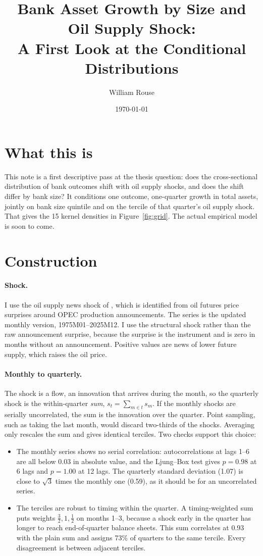 \documentclass[11pt]{article}
\title{Bank Asset Growth by Size and Oil Supply Shock:\\
       A First Look at the Conditional Distributions}
\author{William Rouse}
\date{\today}
\begin{document}
\maketitle

\section*{What this is}

This note is a first descriptive pass at the thesis question: does the cross-sectional distribution of bank outcomes shift with oil supply shocks, and does the shift differ by bank size? It conditions one outcome, one-quarter growth in total assets, jointly on bank size quintile and on the tercile of that quarter's oil supply shock. That gives the 15 kernel densities in Figure~\ref{fig:grid}. The actual empirical model is soon to come. 

\section*{Construction}

\paragraph{Shock.} I use the oil supply news shock of \citet{kanzig2021}, which is identified from oil futures price surprises around OPEC production announcements. The series is the updated monthly version, 1975M01--2025M12. I use the structural shock rather than the raw announcement surprise, because the surprise is the instrument and is zero in months without an announcement. Positive values are news of lower future supply, which raises the oil price.

\paragraph{Monthly to quarterly.} The shock is a flow, an innovation that arrives during the month, so the quarterly shock is the within-quarter \emph{sum}, $s_t = \sum_{m \in t} s_m$. If the monthly shocks are serially uncorrelated, the sum is the innovation over the quarter. Point sampling, such as taking the last month, would discard two-thirds of the shocks. Averaging only rescales the sum and gives identical terciles. Two checks support this choice:
\begin{itemize}
  \item The monthly series shows no serial correlation: autocorrelations at lags 1--6 are all below 0.03 in absolute value, and the Ljung--Box test gives $p = 0.98$ at 6 lags and $p = 1.00$ at 12 lags. The quarterly standard deviation (1.07) is close to $\sqrt{3}$ times the monthly one (0.59), as it should be for an uncorrelated series.
  \item The terciles are robust to timing within the quarter. A timing-weighted sum puts weights $\tfrac32, 1, \tfrac12$ on months 1--3, because a shock early in the quarter has longer to reach end-of-quarter balance sheets. This sum correlates at 0.93 with the plain sum and assigns 73\% of quarters to the same tercile. Every disagreement is between adjacent terciles.
\end{itemize}
\end{document}
